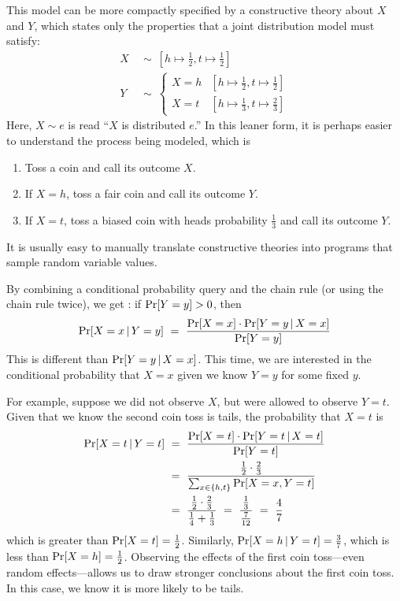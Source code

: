 This model can be more compactly specified by a constructive theory about $X$ and $Y$, which states only the properties that a joint distribution model must satisfy:
\begin{equation}
\begin{aligned}
	X&\ \sim\ \left[h \mapsto \frac{1}{2}, t \mapsto \frac{1}{2}\right]
\\
	Y&\ \sim\ 
	\begin{cases}
		X = h & \left[h \mapsto \frac{1}{2}, t \mapsto \frac{1}{2}\right] \\
		X = t & \left[h \mapsto \frac{1}{3}, t \mapsto \frac{2}{3}\right]
	\end{cases}
\end{aligned}
\end{equation}
Here, $X \sim e$ is read ``$X$ is distributed $e$.''
In this leaner form, it is perhaps easier to understand the process being modeled, which is
\begin{enumerate}
	\item Toss a coin and call its outcome $X$.
	\item If $X = h$, toss a fair coin and call its outcome $Y$.
	\item If $X = t$, toss a biased coin with heads probability $\frac{1}{3}$ and call its outcome $Y$.
\end{enumerate}
It is usually easy to manually translate constructive theories into programs that sample random variable values.

By combining a conditional probability query and the chain rule (or using the chain rule twice), we get : if $\mathrm{Pr}\!\left[{Y = y}\right] > 0$, then
\begin{equation}
	\mathrm{Pr}\!\left[{X = x \,|\, Y = y}\right]\ =\ \frac{\mathrm{Pr}\!\left[{X = x}\right] \cdot \mathrm{Pr}\!\left[{Y = y \,|\, X = x}\right]}{\mathrm{Pr}\!\left[{Y = y}\right]}
\end{equation}
This is different than $\mathrm{Pr}\!\left[{Y = y \,|\, X = x}\right]$.
This time, we are interested in the conditional probability that $X = x$ given we know $Y = y$ for some fixed $y$.

For example, suppose we did not observe $X$, but were allowed to observe $Y = t$.
Given that we know the second coin toss is tails, the probability that $X = t$ is
\begin{equation}
\begin{aligned}
	\mathrm{Pr}\!\left[{X = t \,|\, Y = t}\right]&\ =\ \frac{\mathrm{Pr}\!\left[{X = t}\right] \cdot \mathrm{Pr}\!\left[{Y = t \,|\, X = t}\right]}{\mathrm{Pr}\!\left[{Y = t}\right]}
\\
	&\ =\ \frac{\frac{1}{2} \cdot \frac{2}{3}}{\sum_{x \in \{{h,t}\}} \mathrm{Pr}\!\left[{X = x, Y = t}\right]}
\\
	&\ =\ \frac{\frac{1}{2} \cdot \frac{2}{3}}{\frac{1}{4} + \frac{1}{3}}
	\ =\ \frac{\frac{1}{3}}{\frac{7}{12}}
	\ =\ \frac{4}{7}
\end{aligned}
\end{equation}
which is greater than $\mathrm{Pr}\!\left[{X = t}\right] = \frac{1}{2}$.
Similarly, $\mathrm{Pr}\!\left[{X = h \,|\, Y = t}\right] = \frac{3}{7}$, which is less than $\mathrm{Pr}\!\left[{X = h}\right] = \frac{1}{2}$.
Observing the effects of the first coin toss---even random effects---allows us to draw stronger conclusions about the first coin toss.
In this case, we know it is more likely to be tails.

